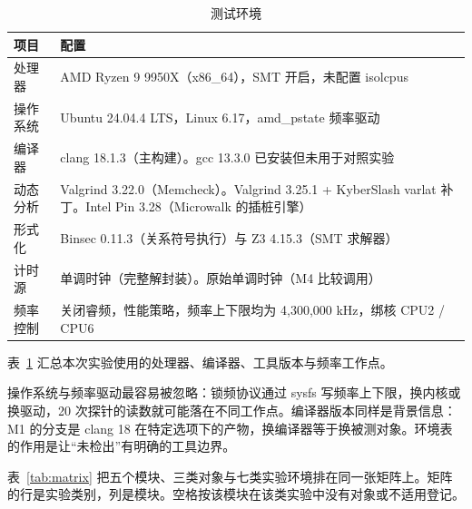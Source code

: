\begin{table}[H]
\centering
\caption{测试环境}
\label{tab:env}
{\small
\begin{tabularx}{\textwidth}{|>{\raggedright\arraybackslash}p{2.3cm}|>{\raggedright\arraybackslash}X|}
\hline
项目 & 配置 \\
\hline
处理器 & AMD Ryzen 9 9950X（x86\_64），SMT 开启，未配置 isolcpus \\
\hline
操作系统 & Ubuntu 24.04.4 LTS，Linux 6.17，amd\_pstate 频率驱动 \\
\hline
编译器 & clang 18.1.3（主构建）。gcc 13.3.0 已安装但未用于对照实验 \\
\hline
动态分析 & Valgrind 3.22.0（Memcheck）。Valgrind 3.25.1 + KyberSlash varlat 补丁。Intel Pin 3.28（Microwalk 的插桩引擎） \\
\hline
形式化 & Binsec 0.11.3（关系符号执行）与 Z3 4.15.3（SMT 求解器） \\
\hline
计时源 & 单调时钟（完整解封装）。原始单调时钟（M4 比较调用） \\
\hline
频率控制 & 关闭睿频，性能策略，频率上下限均为 4,300,000 kHz，绑核 CPU2 / CPU6 \\
\hline
\end{tabularx}
}
\end{table}

表~\ref{tab:env} 汇总本次实验使用的处理器、编译器、工具版本与频率工作点。

操作系统与频率驱动最容易被忽略：锁频协议通过 sysfs 写频率上下限，换内核或换驱动，20 次探针的读数就可能落在不同工作点。编译器版本同样是背景信息：M1 的分支是 clang 18 在特定选项下的产物，换编译器等于换被测对象。环境表的作用是让“未检出”有明确的工具边界。

表~\ref{tab:matrix} 把五个模块、三类对象与七类实验环境排在同一张矩阵上。矩阵的行是实验类别，列是模块。空格按该模块在该类实验中没有对象或不适用登记。%

